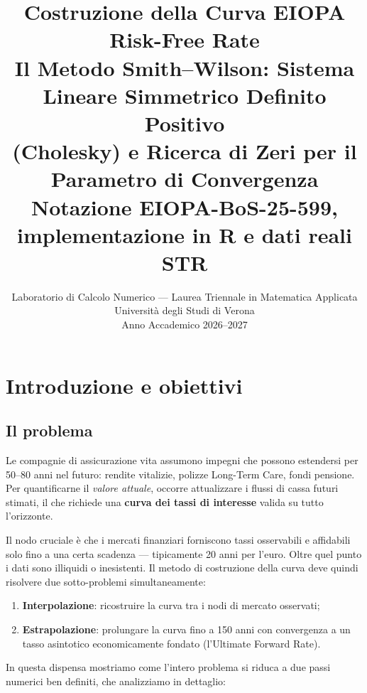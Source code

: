 \documentclass[11pt,a4paper]{article}
\title{%
  \textbf{Costruzione della Curva EIOPA Risk-Free Rate}\\[6pt]
  \large Il Metodo Smith--Wilson: Sistema Lineare Simmetrico Definito Positivo\\[3pt]
  (Cholesky) e Ricerca di Zeri per il Parametro di Convergenza\\[4pt]
  \normalsize Notazione EIOPA-BoS-25-599, implementazione in R e dati reali \texteuro{}STR
}
\author{Laboratorio di Calcolo Numerico --- Laurea Triennale in Matematica Applicata\\
  Universit\`a degli Studi di Verona\\[2pt]
  Anno Accademico 2026--2027}
\date{}
\theoremstyle{plain}
\theoremstyle{definition}
\theoremstyle{remark}
\begin{document}
\maketitle
\tableofcontents
\newpage

\section{Introduzione e obiettivi}
\label{sec:intro}

\subsection{Il problema}

Le compagnie di assicurazione vita assumono impegni che possono estendersi per
50--80 anni nel futuro: rendite vitalizie, polizze Long-Term Care, fondi pensione.
Per quantificarne il \emph{valore attuale}, occorre attualizzare i flussi di cassa
futuri stimati, il che richiede una \textbf{curva dei tassi di interesse} valida su
tutto l'orizzonte.

Il nodo cruciale \`e che i mercati finanziari forniscono tassi osservabili e affidabili
solo fino a una certa scadenza --- tipicamente 20 anni per l'euro. Oltre quel punto i
dati sono illiquidi o inesistenti. Il metodo di costruzione della curva deve quindi
risolvere due sotto-problemi simultaneamente:
\begin{enumerate}
  \item \textbf{Interpolazione}: ricostruire la curva tra i nodi di mercato osservati;
  \item \textbf{Estrapolazione}: prolungare la curva fino a 150 anni con convergenza
        a un tasso asintotico economicamente fondato (l'Ultimate Forward Rate).
\end{enumerate}

In questa dispensa mostriamo come l'intero problema si riduca a due passi numerici
ben definiti, che analizziamo in dettaglio:
\end{document}
